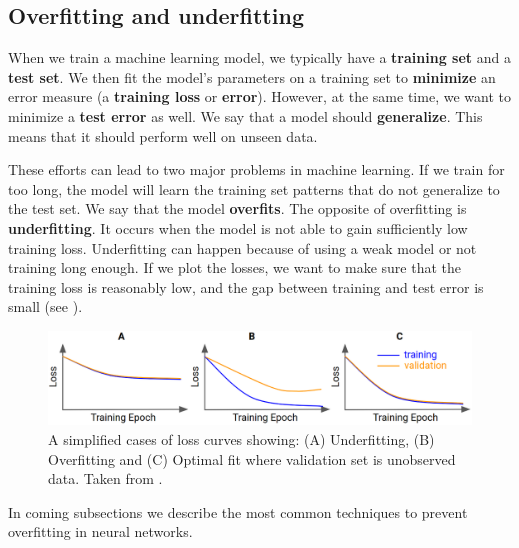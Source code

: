 
    \subsection{Overfitting and underfitting}

    When we train a machine learning model, we typically have a
    \textbf{training set} and a \textbf{test set}. We then fit the model's
    parameters on a training set to \textbf{minimize} an error measure
    (a \textbf{training loss} or \textbf{error}). However, at the same time, we want
    to minimize a \textbf{test error} as well. We say that a model should
    \textbf{generalize}. This means that it should perform well on unseen data.

    These efforts can lead to two major problems in machine learning. If we train
    for too long, the model will learn the training set patterns that do not
    generalize to the test set. We say that the model \textbf{overfits}. The
    opposite of overfitting is \textbf{underfitting}. It occurs when the model is
    not able to gain sufficiently low training loss. Underfitting can happen because
    of using a weak model or not training long enough. If we plot the losses, we
    want to make sure that the training loss is reasonably low, and the gap between
    training and test error is small (see ).

    \begin{figure}[h]
        \centering
        \includegraphics[width=\linewidth]{Sources/Figures/fitting.png}
        \caption{A simplified cases of loss curves showing:
            (A) Underfitting, (B) Overfitting and (C) Optimal fit where validation
            set is unobserved data. Taken from
            \cite{bileschi2020deep}.}
        \label{fig:loss_plot}
    \end{figure}

    In coming subsections we describe the most common techniques to prevent
    overfitting in neural networks.

